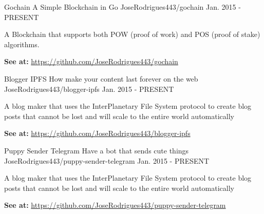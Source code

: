 

\begin{cventries}

  \cventry
    {Gochain} %
    {A Simple Blockchain in Go} %
    {JoseRodrigues443/gochain} %
    {Jan. 2015 - PRESENT} %
    {
      \begin{cvitems} %
        \item {A Blockchain that supports both POW (proof of work) and POS (proof of stake) algorithms.}
        \item {\textbf{See at:} \url{https://github.com/JoseRodrigues443/gochain}}
      \end{cvitems}
    }


  \cventry
    {Blogger IPFS} %
    {How make your content last forever on the web} %
    {JoseRodrigues443/blogger-ipfs} %
    {Jan. 2015 - PRESENT} %
    {
      \begin{cvitems} %
        \item {A blog maker that uses the InterPlanetary File System protocol to create blog posts that cannot be lost and will scale to the entire world automatically}
        \item {\textbf{See at:} \url{https://github.com/JoseRodrigues443/blogger-ipfs}}
      \end{cvitems}
    }


  \cventry
    {Puppy Sender Telegram} %
    {Have a bot that sends cute things} %
    {JoseRodrigues443/puppy-sender-telegram} %
    {Jan. 2015 - PRESENT} %
    {
      \begin{cvitems} %
        \item {A blog maker that uses the InterPlanetary File System protocol to create blog posts that cannot be lost and will scale to the entire world automatically}
        \item {\textbf{See at:} \url{https://github.com/JoseRodrigues443/puppy-sender-telegram}}
      \end{cvitems}
    }


\end{cventries}
